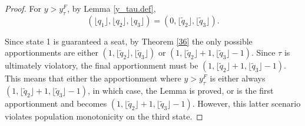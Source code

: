 \documentclass[11pt]{article}
\theoremstyle{definition}
\theoremstyle{definition}
\begin{document}
\begin{proof}
For $y > y_{\tau}^F$, by Lemma \ref{y_tau.def}, 
$$(\lfloor q_1 \rfloor, \lfloor q_2 \rfloor, \lfloor q_3 \rfloor) = (0, \lfloor \tilde q_2 \rfloor, \lfloor \tilde q_3 \rfloor).$$

Since state 1 is guaranteed a seat, by Theorem \ref{36} the only possible apportionments are either $(1,\lfloor \tilde q_2 \rfloor,\lfloor \tilde q_3 \rfloor)$ or $(1,\lfloor \tilde q_2 \rfloor+1,\lfloor \tilde q_3 \rfloor-1)$. Since $\tau$ is ultimately violatory, the final apportionment must be $(1,\lfloor \tilde q_2 \rfloor+1,\lfloor \tilde q_3 \rfloor-1)$. This means that either the apportionment where $y > y_{\tau}^F$ is either always $(1,\lfloor \tilde q_2 \rfloor+1,\lfloor \tilde q_3 \rfloor-1)$, in which case, the Lemma is proved, or is the first apportionment and becomes $(1,\lfloor \tilde q_2 \rfloor+1,\lfloor \tilde q_3 \rfloor-1)$. However, this latter scenario violates population monotonicity on the third state. 
\end{proof}
\end{document}
